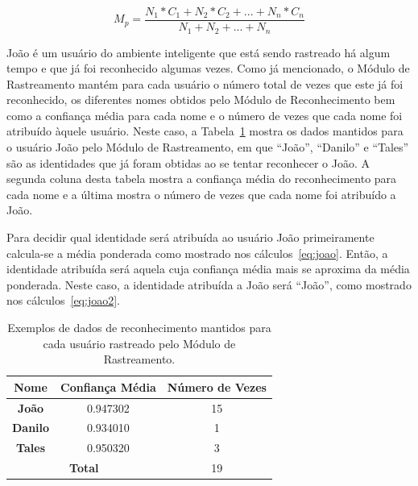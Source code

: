 	\begin{equation}
		\label{eq:media_ponderada}
		M_p = \frac{N_1 * C_1 + N_2 * C_2 + ... + N_n * C_n}{N_1 + N_2 + ... + N_n}
	\end{equation}


	\begin{description}
 		João é um usuário do ambiente inteligente que está sendo rastreado há algum tempo e que já foi reconhecido algumas vezes. Como já mencionado, o Módulo de Rastreamento mantém para cada usuário o número total de vezes que este já foi reconhecido, os diferentes nomes obtidos pelo Módulo de Reconhecimento bem como a confiança média para cada nome e o número de vezes que cada nome foi atribuído àquele usuário. Neste caso, a Tabela~\ref{tab:joao} mostra os dados mantidos para o usuário João pelo Módulo de Rastreamento, em que ``João'', ``Danilo'' e ``Tales'' são as identidades que já foram obtidas ao se tentar reconhecer o João. A segunda coluna desta tabela mostra a confiança média do reconhecimento para cada nome e a última mostra o número de vezes que cada nome foi atribuído a João. 

 		Para decidir qual identidade será atribuída ao usuário João primeiramente calcula-se a média ponderada como mostrado nos cálculos~\ref{eq:joao}. Então, a identidade atribuída será aquela cuja confiança média mais se aproxima da média ponderada. Neste caso, a identidade atribuída a João será ``João'', como mostrado nos cálculos~\ref{eq:joao2}.

	\end{description}

	\begin{table}[htb]
		\begin{center}
			\caption{Exemplos de dados de reconhecimento mantidos para cada usuário rastreado pelo Módulo de Rastreamento.}
			\label{tab:joao}
			\begin{tabular}{|c|c|c|}
				\hline \bf Nome & Confiança Média & Número de Vezes \\
				\hline \hline \bf João & 0.947302 & 15 \\
				\hline \bf  Danilo & 0.934010 & 1 \\
				\hline \bf Tales & 0.950320 & 3 \\
				\hline
				\hline \multicolumn{2}{|c|}{\bf Total}  & 19 \\
				\hline
			\end{tabular}
		\end{center}
	\end{table}

